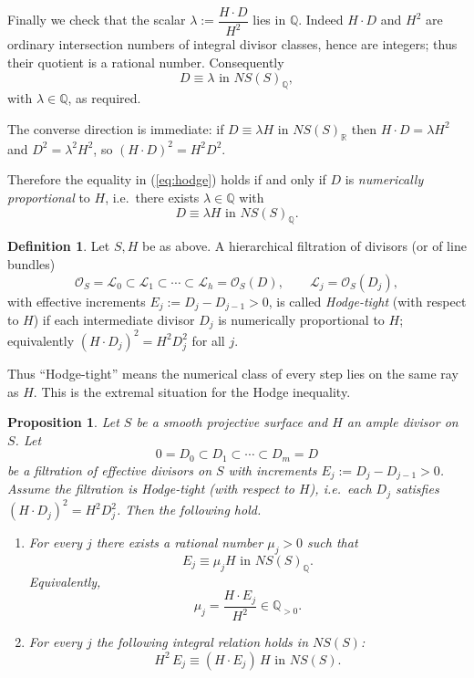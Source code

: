 \documentclass[14pt]{amsart}
\theoremstyle{plain}
\newtheorem{prop}[thm]{\bf Proposition}
\theoremstyle{definition}
\newtheorem{defn}[thm]{\bf Definition}
\theoremstyle{remark}
\theoremstyle{example}
\def \RR{\mathbb{R}}
\def \Q{\mathbb{Q}}
\def \L{\mathcal{L}}
\def \O{\mathcal{O}}
\begin{document}
Finally we check that the scalar $\lambda:=\dfrac{H\cdot D}{H^2}$ lies in $\Q$. Indeed $H\cdot D$ and $H^2$ are ordinary intersection numbers of integral divisor classes, hence are integers; thus their quotient is a rational number. Consequently
$$
D \equiv \lambda \text{  in  } NS(S)_{\Q},
$$
with $\lambda\in\Q$, as required.

The converse direction is immediate: if $D\equiv\lambda H$ in $NS(S)_{\RR}$ then $H\cdot D=\lambda H^2$ and $D^2=\lambda^2 H^2$, so $(H\cdot D)^2 = H^2 D^2$.

Therefore the equality in (\ref{eq:hodge}) holds if and only if $D$ is \emph{numerically proportional} to $H$, i.e.\ there exists $\lambda\in\Q$ with
$$
D\equiv \lambda H \text{ in } NS(S)_{\Q}.
$$



\begin{defn}
Let $S,H$ be as above.  A hierarchical filtration of divisors (or of line bundles)
$$\O_S=\L_0\subset\L_1\subset\cdots\subset\L_h=\O_S(D),\qquad \L_j=\O_S(D_j),$$
with effective increments $E_j:=D_j-D_{j-1}>0$, is called \emph{Hodge-tight}
(with respect to $H$) if each intermediate divisor $D_j$ is numerically
proportional to $H$; equivalently $(H\cdot D_j)^2 = H^2 D_j^2$ for all $j$.
\end{defn}

Thus ``Hodge-tight'' means the numerical class of every step lies on the same ray as $H$.
This is the extremal situation for the Hodge inequality.

\begin{prop}
\label{cor:hodge-tight}
Let $S$ be a smooth projective surface and $H$ an ample divisor on $S$.  
Let
$$
0=D_0 \subset D_1 \subset \cdots \subset D_m=D
$$
be a filtration of effective divisors on $S$ with increments $E_j:=D_j-D_{j-1}>0$.
Assume the filtration is Hodge-tight (with respect to $H$), i.e.\ each $D_j$ satisfies
$(H\cdot D_j)^2=H^2D_j^2$.
Then the following hold.
\begin{enumerate}
\item For every $j$ there exists a rational number $\mu_j>0$ such that
$$
E_j \equiv \mu_j H \text{ in }NS(S)_{\Q}.
$$
Equivalently,
$$
\mu_j=\frac{H\cdot E_j}{H^2}\in\Q_{>0}.
$$

\item For every $j$ the following integral relation holds in $NS(S)$:
$$
H^2\,E_j \equiv (H\cdot E_j)\,H \text{ in }NS(S).
$$
\end{enumerate}

\end{prop}
\end{document}
